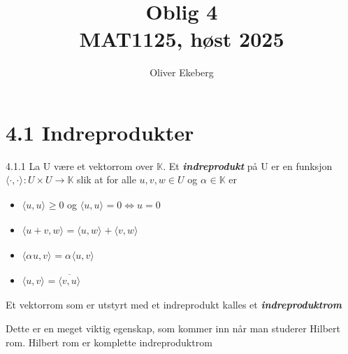 \documentclass[a4paper,norsk]{article}
\title{Oblig 4 \\ MAT1125, høst 2025}
\author{Oliver Ekeberg}
\renewcommand{\geq}{\geqslant}
\begin{document}
\tableofcontents

\section*{4.1 Indreprodukter}

\begin{definitionbox}{4.1.1}{}
La U være et vektorrom over $ \mathbb{K} $. Et \textbf{\textit{indreprodukt}} på U er en funksjon $ \langle \cdot, \cdot \rangle_{  }: U \times U \to \mathbb{K} $ slik at for alle $ u, v, w \in U $ og $ \alpha_{}^{} \in \mathbb{K} $ er
\begin{itemize}
    \item $ \langle u, u \rangle_{  } \geq 0 $ og $ \langle u, u \rangle_{  } =0 \iff u =0 $
    \item $ \langle u + v, w \rangle_{  } = \langle u, w \rangle_{  } + \langle v, w \rangle_{  }  $
    \item $ \langle \alpha_{}^{} u, v \rangle_{  } = \alpha_{}^{} \langle u, v \rangle_{  } $
    \item $ \langle u, v \rangle_{  } = \overline{ \langle v, u \rangle_{  } } $     
\end{itemize}
Et vektorrom som er utstyrt med et indreprodukt kalles et \textbf{\textit{indreproduktrom}} 
\end{definitionbox}

Dette er en meget viktig egenskap, som kommer inn når man studerer Hilbert rom. Hilbert rom er komplette indreproduktrom
\end{document}
